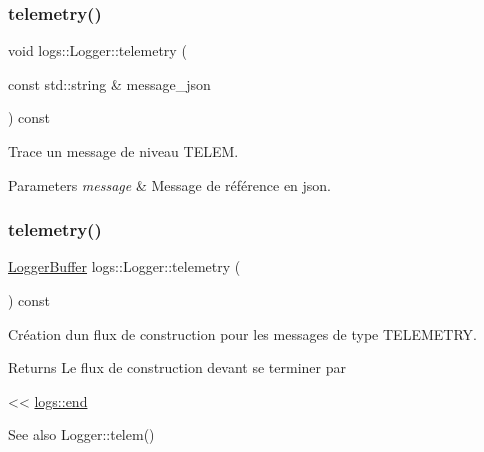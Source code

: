 \subsubsection{\texorpdfstring{telemetry()}{telemetry()}\hspace{0.1cm}{\footnotesize\ttfamily [1/2]}}
{\footnotesize\ttfamily void logs\+::\+Logger\+::telemetry (\begin{DoxyParamCaption}\item[{const std\+::string \&}]{message\+\_\+json }\end{DoxyParamCaption}) const\hspace{0.3cm}{\ttfamily [inline]}}



Trace un message de niveau T\+E\+L\+EM. 


\begin{DoxyParams}{Parameters}
{\em message} & Message de référence en json. \\
\hline
\end{DoxyParams}
\mbox{\label{classlogs_1_1Logger_a6a37df307f0264996d3cd72fac28411c}} 
\subsubsection{\texorpdfstring{telemetry()}{telemetry()}\hspace{0.1cm}{\footnotesize\ttfamily [2/2]}}
{\footnotesize\ttfamily \hyperlink{classlogs_1_1Logger_1_1LoggerBuffer}{Logger\+Buffer} logs\+::\+Logger\+::telemetry (\begin{DoxyParamCaption}{ }\end{DoxyParamCaption}) const\hspace{0.3cm}{\ttfamily [inline]}}



Création d\textquotesingle{}un flux de construction pour les messages de type T\+E\+L\+E\+M\+E\+T\+RY. 

\begin{DoxyReturn}{Returns}
Le flux de construction devant se terminer par
\begin{DoxyCode}
<< \hyperlink{Logger_8hpp_ac6f325c6cfe6189bc8e243daa184453b}{logs::end} 
\end{DoxyCode}
 
\end{DoxyReturn}
\begin{DoxySeeAlso}{See also}
Logger\+::telem() 
\end{DoxySeeAlso}
\mbox{\label{classlogs_1_1Logger_a240e8d7b58195c85bd7b4e4a3417d955}} 
